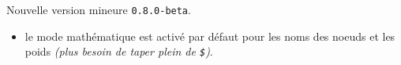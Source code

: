 Nouvelle version mineure \verb+0.8.0-beta+.

\begin{itemize}[itemsep=.5em]
    \item {}
          le mode mathématique est activé par défaut pour les noms des noeuds et les poids \emph{(plus besoin de taper plein de \texttt{\$})}.
\end{itemize}


\separation